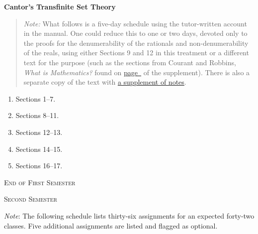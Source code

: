 \documentclass[10pt]{article}
\begin{document}
\textbf{Cantor's Transfinite Set Theory}
\label{Cantor}
\vspace{-0.2em}
\begin{quote}
	{\small\emph{Note:} What follows is a five-day schedule 
using the tutor-written account 
in the manual. One could reduce this to one or two days,
devoted only to the proofs for the denumerability of
the rationals and non-denumerability of the reals,
using either 
Sections 9 and 12 in this treatment or
a different text for the purpose  (such as
the sections from Courant and Robbins, \emph{What
	is Mathematics?} found on
\hyperref[supple.59]{page~\pageref{supple.59}} of the
supplement).
There is also a separate copy of the text with \href{https://drive.google.com/file/d/14VyXI_JIWel6-rEA67aYdqD_CrFCRLXo/view?usp=sharing}{a supplement of notes}.

}
\end{quote}
\begin{enumerate}[noitemsep]
	\item Sections 1--7.
	\item Sections 8--11.
	\item Sections 12--13.
	\item Sections 14--15.
	\item Sections 16--17.
\end{enumerate}

\bigskip

\begin{center}
\textsc{\small{End of First Semester}}
\end{center}


\newpage
\begin{center}
	\textsc{\small{Second Semester}}
\end{center}
{\small \emph{Note}: The following schedule lists 
	thirty-six assignments for an expected forty-two
	classes. Five additional
	assignments are listed and flagged as optional.
	
	}
\end{document}
